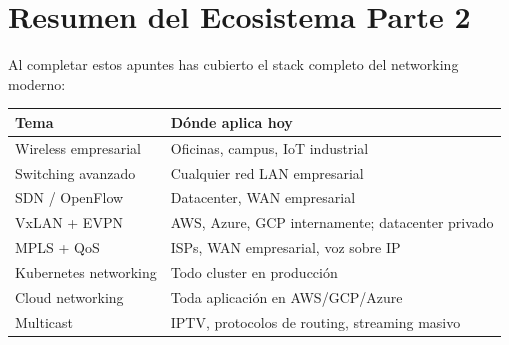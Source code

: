 \section{ Resumen del Ecosistema Parte 2}

Al completar estos apuntes has cubierto el stack completo del networking moderno:

\begin{center}
\begin{tabular}{ll}
\toprule
\textbf{Tema} & \textbf{Dónde aplica hoy} \\
\midrule
Wireless empresarial   & Oficinas, campus, IoT industrial \\
Switching avanzado     & Cualquier red LAN empresarial \\
SDN / OpenFlow         & Datacenter, WAN empresarial \\
VxLAN + EVPN           & AWS, Azure, GCP internamente; datacenter privado \\
MPLS + QoS             & ISPs, WAN empresarial, voz sobre IP \\
Kubernetes networking  & Todo cluster en producción \\
Cloud networking       & Toda aplicación en AWS/GCP/Azure \\
Multicast              & IPTV, protocolos de routing, streaming masivo \\
\bottomrule
\end{tabular}
\end{center}
